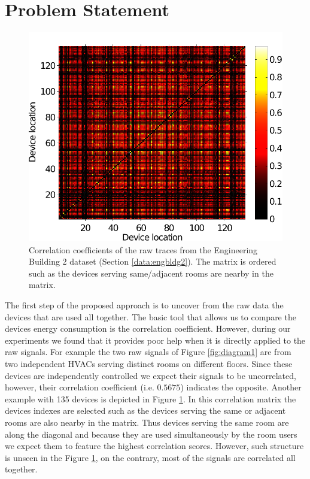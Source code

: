 \section{Problem Statement}
\begin{figure}
\begin{center}
\includegraphics[width=.45\textwidth]{img/heatMap_raw_201106-eps-converted-to.pdf}
\caption{Correlation coefficients of the raw traces from the Engineering Building 2 dataset (Section \ref{data:engbldg2}).
The matrix is ordered such as the devices serving same/adjacent rooms are nearby in the matrix.}
\label{fig:heatmap:raw}
\end{center}
\end{figure}

The first step of the proposed approach is to uncover from the raw data the devices that are used all together.
The basic tool that allows us to compare the devices energy consumption is the correlation coefficient.
However, during our experiments we found that it provides poor help when it is directly applied to the raw signals.
For example the two raw signals of Figure \ref{fig:diagram1} are from two independent HVACs serving distinct rooms on different floors.
Since these devices are independently controlled we expect their signals to be uncorrelated, however, their correlation coefficient (i.e. $0.5675$) indicates the opposite.
Another example with 135 devices is depicted in Figure \ref{fig:heatmap:raw}.
In this correlation matrix the devices indexes are selected such as the devices serving the same or adjacent rooms are also nearby in the matrix.
Thus devices serving the same room are along the diagonal and because they are used simultaneously by the room users we expect them to feature the highest correlation scores.
However, such structure is unseen in the Figure \ref{fig:heatmap:raw}, on the contrary, most of the signals are correlated all together.

